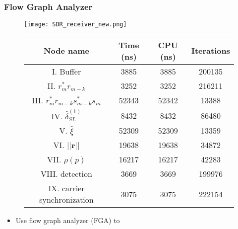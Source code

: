   \begin{frame}
    \frametitle{Flow Graph Analyzer}

    \begin{figure}
        \centering
        \begin{minipage}{.3\textwidth}
          \centering
          \texttt{[image: SDR\_receiver\_new.png]}
        \end{minipage}%
        \begin{minipage}{.7\textwidth}
          \centering
          \begin{table}[t]
            \tiny
            \centering %
            \begin{tabular}{c c c c} %
            \hline\hline %
            Node name & Time (ns) & CPU (ns) & Iterations \\ [0.5ex] %
            \hline %
            I. Buffer  & 3885 & 3885 & 200135 \\ %
            II. $r_m^*r_{m-k}$  & 3252 & 3252 & 216211 \\
            III. $r_m^*r_{m-k}s_{m-k}^*s_m$ & 52343 & 52342 & 13388 \\
            IV. $\hat{\delta}_{SL}^{(1)}$ & 8432 & 8432 & 86480 \\
            V. $\hat{\xi}$ & 52309 & 52309 & 13359 \\
            VI. $||\bm{r}||$ & 19638 & 19638 & 34872 \\ %
            VII. $\rho(p)$ & 16217 & 16217 & 42283 \\
            VIII. detection & 3669 & 3669 & 199976 \\
            IX. carrier synchronization & 3075 & 3075 & 222154  \\ [1ex]
            \hline
            \end{tabular}
            \label{table:BM_function_nodes} %
          \end{table}
        
        \end{minipage}
    \end{figure}

    \begin{itemize}
       \item Use flow graph analyzer (FGA) to 
    \end{itemize}
  \end{frame}